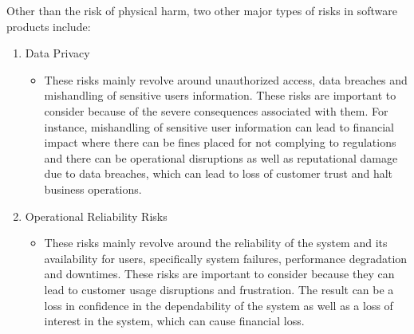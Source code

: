\documentclass{article}
\begin{document}
\begin{enumerate}
    Other than the risk of physical harm, two other major types of risks in software products include:
    \begin{enumerate}
        \item Data Privacy
        \begin{itemize}
            \item These risks mainly revolve around unauthorized access, data breaches and mishandling of sensitive users information. These risks are important to consider because of the severe consequences associated with them. For instance, mishandling of sensitive user information can lead to financial impact where there can be fines placed for not complying to regulations and there can be operational disruptions as well as reputational damage due to data breaches, which can lead to loss of customer trust and halt business operations.
        \end{itemize}
        \item Operational Reliability Risks
        \begin{itemize}
            \item These risks mainly revolve around the reliability of the system and its availability for users, specifically system failures, performance degradation and downtimes. These risks are important to consider because they can lead to customer usage disruptions and frustration. The result can be a loss in confidence in the dependability of the system as well as a loss of interest in the system, which can cause financial loss.
        \end{itemize}
    \end{enumerate}
    
\end{enumerate}
\end{document}
